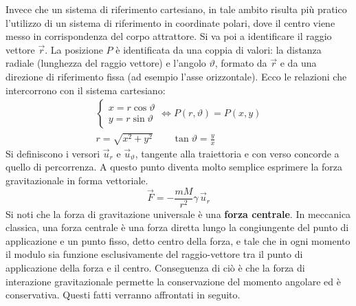 \documentclass[10pt,a4paper]{book}
\begin{document}
\begin{figure}[htpb]
\end{figure}
\FloatBarrier
Invece che un sistema di riferimento cartesiano, in tale ambito risulta più pratico l'utilizzo di un sistema di riferimento in coordinate polari, dove il centro viene messo in corrispondenza del corpo attrattore. Si va poi a identificare il raggio vettore $\vec{r}$.  La posizione $P$ è identificata da una coppia di valori: la distanza radiale (lunghezza del raggio vettore) e l'angolo $\vartheta$, formato da $\vec{r}$ e da una direzione di riferimento fissa (ad esempio l'asse orizzontale). Ecco le relazioni che intercorrono con il sistema cartesiano:
\begin{gather*}
	\begin{cases} x=r\cos\vartheta \\ y=r\sin\vartheta \end{cases} \iff P(r,\vartheta)=P(x,y) \\
	r=\sqrt{x^2+y^2} \qquad \tan\vartheta=\frac{y}{x}
\end{gather*}
Si definiscono i versori $\vec{u}_r$ e $\vec{u}_\vartheta$, tangente alla traiettoria e con verso concorde a quello di percorrenza. A questo punto diventa molto semplice esprimere la forza gravitazionale in forma vettoriale.
\[
	\boxed{\vec{F}=-\frac{mM}{r^2}\gamma\, \vec{u}_r}
\]
Si noti che la forza di gravitazione universale è una \textbf{forza centrale}. In meccanica classica, una forza centrale è una forza diretta lungo la congiungente del punto di applicazione e un punto fisso, detto centro della forza, e tale che in ogni momento il modulo sia funzione esclusivamente del raggio-vettore tra il punto di applicazione della forza e il centro. Conseguenza di ciò è che la forza di interazione gravitazionale permette la conservazione del momento angolare ed è conservativa. Questi fatti verranno affrontati in seguito.
\end{document}
